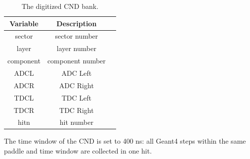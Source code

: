 \begin{table}[h]
	\begin{center}
		\begin{tabular}{| c | c | c |}
			\hline \hline
			Variable  &          Description     \\
			\hline
              sector  &        sector number     \\
               layer  &         layer number     \\
           component  &     component number     \\
                ADCL  &             ADC Left     \\
                ADCR  &            ADC Right     \\
                TDCL  &             TDC Left     \\
                TDCR  &            TDC Right     \\
                hitn  &           hit number     \\
			\hline \hline
		\end{tabular}
	\end{center}
	\caption{The digitized CND bank.}\label{tab:cndBank}
\end{table}

The time window  of the CND is set to 400 ns: all Geant4 steps within the same paddle and time window are collected in one hit.
